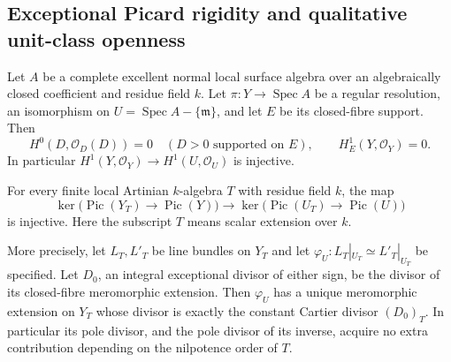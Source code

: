 \subsection{Exceptional Picard rigidity and qualitative unit-class openness}

\begin{lemma}
\label{D:exceptional-infinitesimal-Picard-kernel}
Let $A$ be a complete excellent normal local surface algebra
over an algebraically closed coefficient and residue field $k$.
Let $\pi:Y\to\operatorname{Spec}A$ be a regular resolution,
an isomorphism on $U=\operatorname{Spec}A-\{\mathfrak m\}$,
and let $E$ be its closed-fibre support. Then
\[
 H^0(D,\mathcal O_D(D))=0\quad(D>0\text{ supported on }E),
 \qquad H^1_E(Y,\mathcal O_Y)=0.                       \tag{D.IP.1}
\]
In particular $H^1(Y,\mathcal O_Y)\to H^1(U,\mathcal O_U)$
is injective.

For every finite local Artinian $k$-algebra $T$ with residue
field $k$, the map
\[
 \ker\bigl(\operatorname{Pic}(Y_T)\to\operatorname{Pic}(Y)\bigr)
 \longrightarrow
 \ker\bigl(\operatorname{Pic}(U_T)\to\operatorname{Pic}(U)\bigr)
                                                               \tag{D.IP.2}
\]
is injective. Here the subscript $T$ means scalar extension
over $k$.

More precisely, let $L_T,L'_T$ be line bundles on $Y_T$ and
let $\varphi_U:L_T|_{U_T}\simeq L'_T|_{U_T}$ be specified.
Let $D_0$, an integral exceptional divisor of either sign,
be the divisor of its closed-fibre meromorphic extension.
Then $\varphi_U$ has a unique meromorphic extension on $Y_T$
whose divisor is exactly the constant Cartier divisor
$(D_0)_T$. In particular its pole divisor, and the pole
divisor of its inverse, acquire no extra contribution
depending on the nilpotence order of $T$.
\end{lemma}

